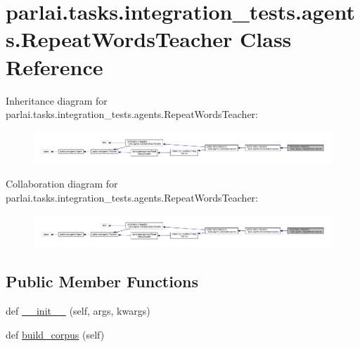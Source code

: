 \hypertarget{classparlai_1_1tasks_1_1integration__tests_1_1agents_1_1RepeatWordsTeacher}{}\section{parlai.\+tasks.\+integration\+\_\+tests.\+agents.\+Repeat\+Words\+Teacher Class Reference}
\label{classparlai_1_1tasks_1_1integration__tests_1_1agents_1_1RepeatWordsTeacher}


Inheritance diagram for parlai.\+tasks.\+integration\+\_\+tests.\+agents.\+Repeat\+Words\+Teacher\+:
\nopagebreak
\begin{figure}[H]
\begin{center}
\leavevmode
\includegraphics[width=350pt]{d7/d62/classparlai_1_1tasks_1_1integration__tests_1_1agents_1_1RepeatWordsTeacher__inherit__graph}
\end{center}
\end{figure}


Collaboration diagram for parlai.\+tasks.\+integration\+\_\+tests.\+agents.\+Repeat\+Words\+Teacher\+:
\nopagebreak
\begin{figure}[H]
\begin{center}
\leavevmode
\includegraphics[width=350pt]{d4/df9/classparlai_1_1tasks_1_1integration__tests_1_1agents_1_1RepeatWordsTeacher__coll__graph}
\end{center}
\end{figure}
\subsection*{Public Member Functions}
\begin{DoxyCompactItemize}
\item 
def \hyperlink{classparlai_1_1tasks_1_1integration__tests_1_1agents_1_1RepeatWordsTeacher_a169b9a70cebc4aeb54e4b90ddba644ac}{\+\_\+\+\_\+init\+\_\+\+\_\+} (self, args, kwargs)
\item 
def \hyperlink{classparlai_1_1tasks_1_1integration__tests_1_1agents_1_1RepeatWordsTeacher_ad03d8fb602aca6baf0b62f633b3bb54c}{build\+\_\+corpus} (self)
\end{DoxyCompactItemize}
